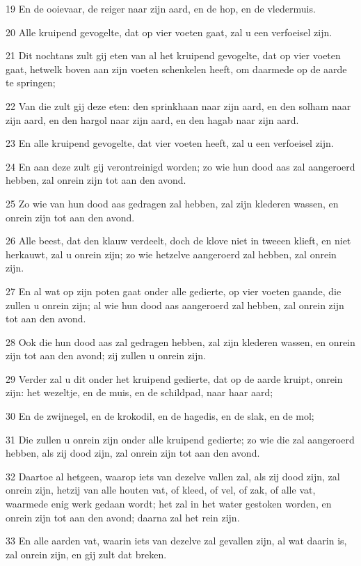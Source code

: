 \par 19 En de ooievaar, de reiger naar zijn aard, en de hop, en de vledermuis.
\par 20 Alle kruipend gevogelte, dat op vier voeten gaat, zal u een verfoeisel zijn.
\par 21 Dit nochtans zult gij eten van al het kruipend gevogelte, dat op vier voeten gaat, hetwelk boven aan zijn voeten schenkelen heeft, om daarmede op de aarde te springen;
\par 22 Van die zult gij deze eten: den sprinkhaan naar zijn aard, en den solham naar zijn aard, en den hargol naar zijn aard, en den hagab naar zijn aard.
\par 23 En alle kruipend gevogelte, dat vier voeten heeft, zal u een verfoeisel zijn.
\par 24 En aan deze zult gij verontreinigd worden; zo wie hun dood aas zal aangeroerd hebben, zal onrein zijn tot aan den avond.
\par 25 Zo wie van hun dood aas gedragen zal hebben, zal zijn klederen wassen, en onrein zijn tot aan den avond.
\par 26 Alle beest, dat den klauw verdeelt, doch de klove niet in tweeen klieft, en niet herkauwt, zal u onrein zijn; zo wie hetzelve aangeroerd zal hebben, zal onrein zijn.
\par 27 En al wat op zijn poten gaat onder alle gedierte, op vier voeten gaande, die zullen u onrein zijn; al wie hun dood aas aangeroerd zal hebben, zal onrein zijn tot aan den avond.
\par 28 Ook die hun dood aas zal gedragen hebben, zal zijn klederen wassen, en onrein zijn tot aan den avond; zij zullen u onrein zijn.
\par 29 Verder zal u dit onder het kruipend gedierte, dat op de aarde kruipt, onrein zijn: het wezeltje, en de muis, en de schildpad, naar haar aard;
\par 30 En de zwijnegel, en de krokodil, en de hagedis, en de slak, en de mol;
\par 31 Die zullen u onrein zijn onder alle kruipend gedierte; zo wie die zal aangeroerd hebben, als zij dood zijn, zal onrein zijn tot aan den avond.
\par 32 Daartoe al hetgeen, waarop iets van dezelve vallen zal, als zij dood zijn, zal onrein zijn, hetzij van alle houten vat, of kleed, of vel, of zak, of alle vat, waarmede enig werk gedaan wordt; het zal in het water gestoken worden, en onrein zijn tot aan den avond; daarna zal het rein zijn.
\par 33 En alle aarden vat, waarin iets van dezelve zal gevallen zijn, al wat daarin is, zal onrein zijn, en gij zult dat breken.
